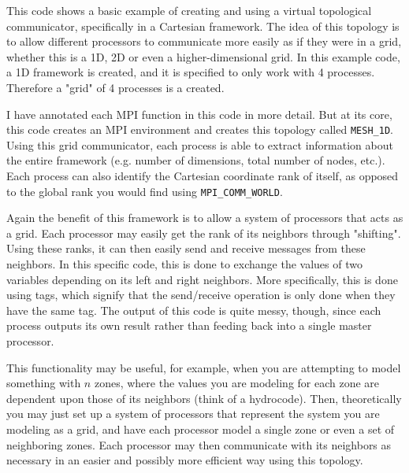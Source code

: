 \documentclass[12pt]{article}
\begin{document}
This code shows a basic example of creating and using a virtual topological
communicator, specifically in a Cartesian framework. The idea of this topology
is to allow different processors to communicate more easily as if they were in
a grid, whether this is a 1D, 2D or even a higher-dimensional grid. In this
example code, a 1D framework is created, and it is specified to only work with
4 processes. Therefore a "grid" of 4 processes is a created.

I have annotated each MPI function in this code in more detail. But at its
core, this code creates an MPI environment and creates this topology called
\texttt{MESH\_1D}. Using this grid communicator, each process is able to
extract information about the entire framework (e.g. number of dimensions,
total number of nodes, etc.). Each process can also identify the Cartesian
coordinate rank of itself, as opposed to the global rank you would find using
\texttt{MPI\_COMM\_WORLD}.

Again the benefit of this framework is to allow a system of processors that
acts as a grid. Each processor may easily get the rank of its neighbors through
"shifting". Using these ranks, it can then easily send and receive messages
from these neighbors. In this specific code, this is done to exchange the
values of two variables depending on its left and right neighbors. More
specifically, this is done using tags, which signify that the send/receive
operation is only done when they have the same tag. The output of this code is
quite messy, though, since each process outputs its own result rather than
feeding back into a single master processor.

This functionality may be useful, for example, when you are attempting to model
something with $n$ zones, where the values you are modeling for each zone are
dependent upon those of its neighbors (think of a hydrocode). Then,
theoretically you may just set up a system of processors that represent the
system you are modeling as a grid, and have each processor model a single zone
or even a set of neighboring zones. Each processor may then communicate with
its neighbors as necessary in an easier and possibly more efficient way using
this topology.
\end{document}
